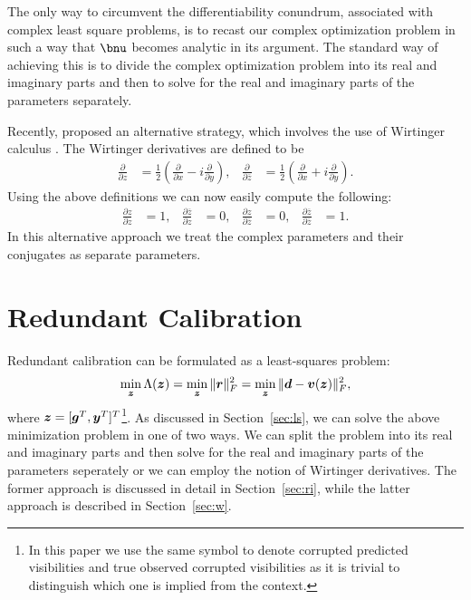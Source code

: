 \documentclass[useAMS,usenatbib]{mn2e}
\newcommand{\bz}{\bmath{z}}
\newcommand{\br}{\bmath{r}}
\newcommand{\bg}{\bmath{g}}
\newcommand{\bd}{\bmath{d}}
\newcommand{\bv}{\bmath{v}}
\newcommand{\by}{\bmath{y}}
\newcommand{\conj}[1]{\overline{#1}}
\begin{document}
The only way to circumvent the differentiability conundrum, associated with complex least square problems, is to recast our complex optimization problem in such a way that $\bnu$ becomes analytic in its argument.
The standard way of achieving this is to divide the complex optimization problem into its real and imaginary parts and then to solve for the real and imaginary parts of the parameters separately.

Recently, \citet{Sorber2012} proposed an alternative strategy, which involves the use of Wirtinger calculus \citep{Wirtinger1927}. The Wirtinger derivatives 
are defined to be 
\begin{align}
\label{eq:wir}
\frac{\partial}{\partial z} &= \frac{1}{2}\left ( \frac{\partial}{\partial x} -  i \frac{\partial}{\partial y} \right ),&\frac{\partial}{\partial \conj{z}} &= \frac{1}{2}\left ( \frac{\partial}{\partial x} +  i \frac{\partial}{\partial y} \right ). 
\end{align}
Using the above definitions we can now easily compute the following:
\begin{align}
\frac{\partial z}{\partial z} & = 1, & \frac{\partial \conj{z}}{\partial z}&=0, & \frac{\partial z}{\partial \conj{z}} & = 0, & \frac{\partial \conj{z}}{\partial \conj{z}}&=1.
\end{align}
In this alternative approach we treat the complex parameters and their conjugates as separate parameters.

\section{Redundant Calibration}
Redundant calibration can be formulated as a least-squares problem:
\begin{equation}
\label{eq:least_squares_red}
\min_{\bz} \Lambda(\bz) = \min_{\bz} \|\br\|_F^2 = \min_{\bz} \|\bd - \bv(\bz)\|_F^2, 
\end{equation}
where $\bz = [\bg^T,\by^T]^T$\footnote{In this paper we use the same symbol to denote corrupted predicted visibilities and true observed corrupted visibilities as it
is trivial to distinguish which one is implied from the context.}. As discussed in Section~\ref{sec:ls}, we can solve the above minimization problem in one of two ways. We can split the problem into its real and
imaginary parts and then solve for the real and imaginary parts of the parameters seperately or we can employ the notion of Wirtinger derivatives. The former 
approach is discussed in detail in Section~\ref{sec:ri}, while the latter approach is described in Section~\ref{sec:w}. 
\end{document}

